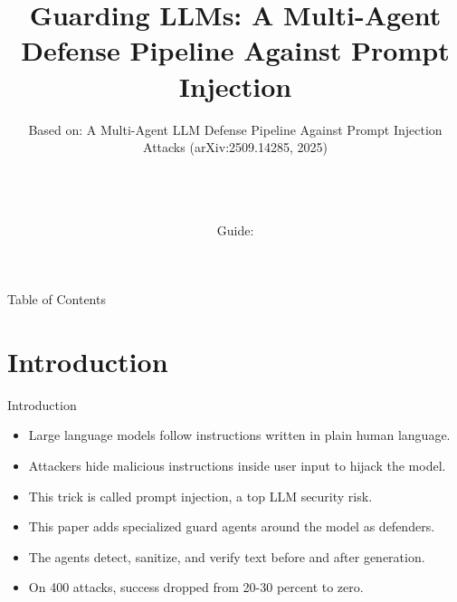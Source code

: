 \documentclass[10pt]{beamer}
\title[B.Tech Seminar]{Guarding LLMs: A Multi-Agent Defense Pipeline Against Prompt Injection}
\subtitle{Based on: A Multi-Agent LLM Defense Pipeline Against Prompt Injection Attacks (arXiv:2509.14285, 2025)}
\author[\studentname\ (\shortinst)]{\studentname \\ \small \rollno \\ \small \rollclass \\ \small Guide: \guidename}
\institute[]{\deptname \\ \collegename}
\date{\seminardate}
\begin{document}
\begin{frame}[plain]
  \titlepage
\end{frame}
\begin{frame}{Table of Contents}
  \tableofcontents
\end{frame}
\section{Introduction}
\begin{frame}{Introduction}
\begin{itemize}
  \item Large language models follow instructions written in plain human language.
  \item Attackers hide malicious instructions inside user input to hijack the model.
  \item This trick is called prompt injection, a top LLM security risk.
  \item This paper adds specialized guard agents around the model as defenders.
  \item The agents detect, sanitize, and verify text before and after generation.
  \item On 400 attacks, success dropped from 20-30 percent to zero.
\end{itemize}
\end{frame}
\end{document}
